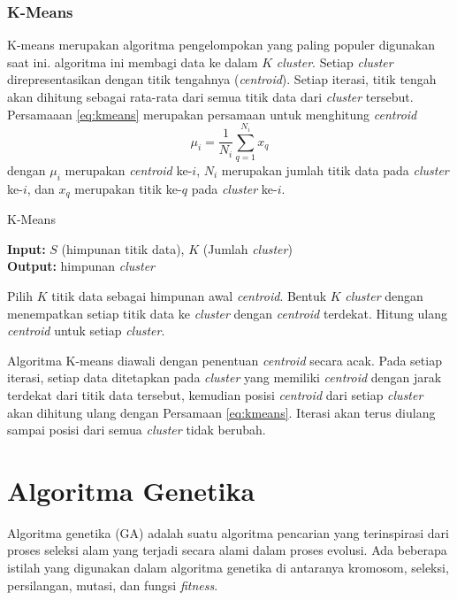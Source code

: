 \subsubsection{K-Means}
K-means merupakan algoritma pengelompokan yang paling populer digunakan saat ini. algoritma ini membagi data ke dalam $K$ \textit{cluster}. Setiap \textit{cluster} direpresentasikan dengan titik tengahnya (\textit{centroid}). Setiap iterasi, titik tengah akan dihitung sebagai rata-rata dari semua titik data dari \textit{cluster} tersebut. Persamaaan \ref{eq:kmeans} merupakan persamaan untuk menghitung \textit{centroid}
\begin{equation}
\label{eq:kmeans}
\mu_i=\frac{1}{N_i}\sum_{q=1}^{N_i}x_q
\end{equation}
dengan $\mu_i$ merupakan \textit{centroid} ke-$i$, $N_i$ merupakan jumlah titik data pada \textit{cluster} ke-$i$, dan $x_q$ merupakan titik ke-$q$ pada \textit{cluster} ke-$i$.

\begin{algorithm} %
\caption{K-Means} %
\label{alg:kmeans} %
\begin{flushleft}
	\textbf{Input:} $S$ (himpunan titik data), $K$ (Jumlah \textit{cluster})\\
	\textbf{Output:} himpunan \textit{cluster}
\end{flushleft}
\begin{algorithmic}[1] %
	\STATE Pilih $K$ titik data sebagai himpunan awal \textit{centroid}.
	\REPEAT 
		\STATE Bentuk $K$ \textit{cluster} dengan menempatkan setiap titik data ke \textit{cluster} dengan \textit{centroid} terdekat.
		\STATE Hitung ulang \textit{centroid} untuk setiap \textit{cluster}. 
\end{algorithmic}
\end{algorithm}

Algoritma K-means diawali dengan penentuan \textit{centroid} secara acak. Pada setiap iterasi, setiap data ditetapkan pada \textit{cluster} yang memiliki \textit{centroid} dengan jarak terdekat dari titik data tersebut, kemudian posisi \textit{centroid} dari setiap \textit{cluster} akan dihitung ulang dengan Persamaan \ref{eq:kmeans}. Iterasi akan terus diulang sampai posisi dari semua \textit{cluster} tidak berubah.

\section{Algoritma Genetika}
Algoritma genetika (GA) adalah suatu algoritma pencarian yang terinspirasi dari proses seleksi alam yang terjadi secara alami dalam proses evolusi. Ada beberapa istilah yang digunakan dalam algoritma genetika di antaranya kromosom, seleksi, persilangan, mutasi, dan fungsi \textit{fitness}.


